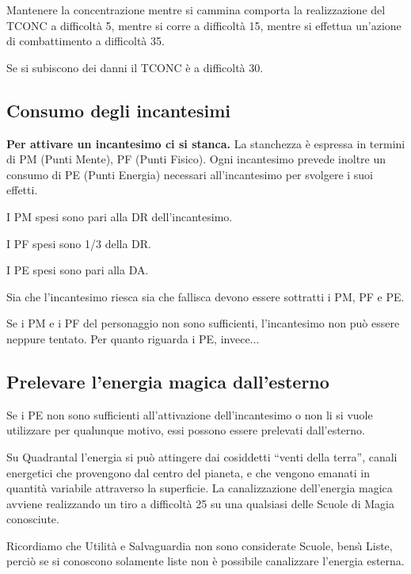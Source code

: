 Mantenere la concentrazione mentre si cammina comporta la realizzazione
del TCONC a difficolt\`a 5, mentre si corre a difficolt\`a 15, mentre
si effettua un'azione di combattimento a difficolt\`a 35. 

Se si subiscono dei danni il TCONC \`e a difficolt\`a 30.


\subsection{Consumo degli incantesimi} 

\textbf{Per attivare un incantesimo ci si stanca.} La stanchezza \`e
espressa in termini di PM (Punti Mente), PF (Punti Fisico). Ogni
incantesimo prevede inoltre un consumo di PE (Punti Energia) necessari
all'incantesimo per svolgere i suoi effetti.

I PM spesi sono pari alla DR dell'incantesimo. 

I PF spesi sono 1/3 della DR. 

I PE spesi sono pari alla DA. 

Sia che l'incantesimo riesca sia che fallisca devono essere sottratti
i PM, PF e PE.

Se i PM e i PF del personaggio non 
sono sufficienti, l'incantesimo non pu\`o
essere neppure tentato. Per quanto riguarda i PE,
invece...

{\raggedright \subsection{Prelevare l'energia magica dall'esterno}}

Se i PE non sono sufficienti all'attivazione dell'incantesimo o non li
si vuole utilizzare per qualunque motivo, essi possono essere
prelevati dall'esterno.

Su Quadrantal l'energia si pu\`o attingere dai cosiddetti ``venti
della terra'', canali energetici che provengono dal centro del
pianeta, e che vengono emanati in quantit\`a variabile attraverso la
superficie. La canalizzazione dell'energia magica avviene realizzando
un tiro a difficolt\`a 25 su una qualsiasi delle Scuole di Magia
conosciute.

\iffullversion
Ricordiamo che Utilit\`a e Salvaguardia non sono considerate Scuole,
bens\`{\i} Liste, perci\`o se si conoscono solamente liste non \`e
possibile canalizzare l'energia esterna.

